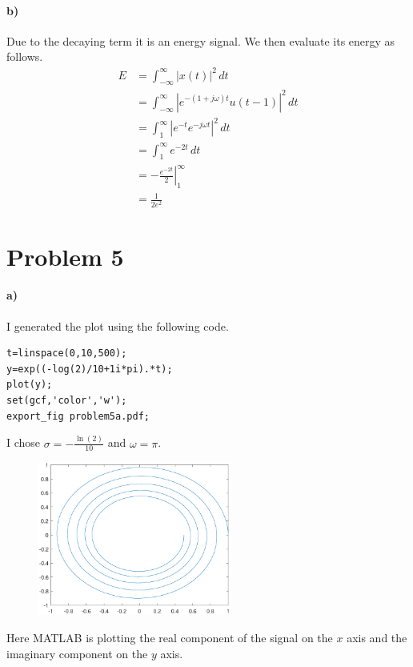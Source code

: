 \documentclass[12pt]{article}
\begin{document}
\paragraph{b)}

Due to the decaying term it is an energy signal. We then evaluate its energy as follows.
\begin{align*}
	E&=\int_{-\infty}^\infty |x(t)|^2\,dt\\
	&=\int_{-\infty}^\infty |e^{-(1+j\omega)t}u(t-1)|^2\,dt\\
	&=\int_1^\infty |e^{-t}e^{-j\omega t}|^2\,dt\\
	&=\int_1^\infty e^{-2t}\,dt\\
	&=\left. -\frac{e^{-2t}}{2}\right|_1^\infty\\
	&=\frac{1}{2e^2}
\end{align*}

\section*{Problem 5}

\paragraph{a)}

I generated the plot using the following code.
\begin{verbatim}
t=linspace(0,10,500);
y=exp((-log(2)/10+1i*pi).*t);
plot(y);
set(gcf,'color','w');
export_fig problem5a.pdf;
\end{verbatim}
I chose \(\sigma=-\frac{\ln(2)}{10}\) and \(\omega=\pi\).
\begin{figure}[H]
    \begin{center}
        \includegraphics[width=2.5in]{problem5a.pdf}
    \end{center}
\end{figure}
Here MATLAB is plotting the real component of the signal on the \(x\) axis and the imaginary component on the \(y\) axis.
\end{document}
